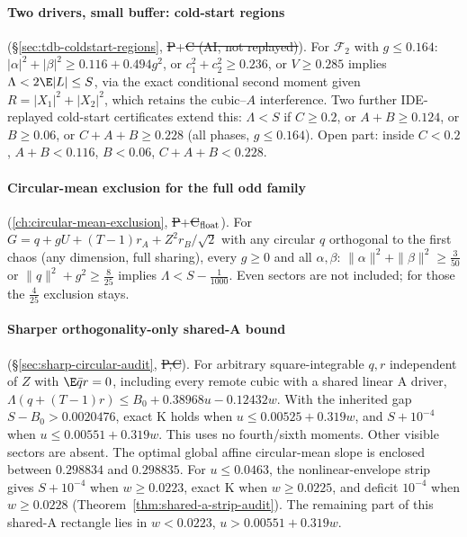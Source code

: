 \paragraph{Two drivers, small buffer: cold-start regions} (\S\ref{sec:tdb-coldstart-regions}, \st{P}+\st{C (AI, not replayed)}). For $\mathcal F_2$ with $g\le0.164$:
$|\alpha|^2+|\beta|^2\ge0.116+0.494g^2$, or $c_1^2+c_2^2\ge0.236$, or $V\ge0.285$ implies $\Lambda<2\E|L|\le S$, via the exact conditional second moment given $R=|X_1|^2+|X_2|^2$,
which retains the cubic--$A$ interference. Two further IDE-replayed cold-start certificates extend this: $\Lambda<S$ if $C\ge0.2$, or $A+B\ge0.124$, or $B\ge0.06$,
or $C+A+B\ge0.228$ (all phases, $g\le0.164$). Open part: inside $C<0.2$, $A+B<0.116$, $B<0.06$, $C+A+B<0.228$.

\paragraph{Circular-mean exclusion for the full odd family} (\autoref{ch:circular-mean-exclusion}, \st{P}+\st{C$_{\rm float}$}). For
$G=q+gU+(T-1)r_A+Z^2r_B/\sqrt2$ with any circular $q$ orthogonal to the first chaos (any dimension, full sharing), every $g\ge0$ and all $\alpha,\beta$:
$\|\alpha\|^2+\|\beta\|^2\ge\frac3{50}$ or $\|q\|^2+g^2\ge\frac8{25}$ implies $\Lambda<S-\frac1{1000}$. Even sectors are not included; for those the $\frac4{25}$ exclusion stays.

\paragraph{Sharper orthogonality-only shared-A bound}
(\S\ref{sec:sharp-circular-audit}, \st{P,C}). For arbitrary square-integrable
$q,r$ independent of $Z$ with $\E\bar q r=0$, including every remote
cubic with a shared linear A driver,
$\Lambda(q+(T-1)r)\le B_0+0.38968u-0.12432w$.
With the inherited gap $S-B_0>0.0020476$, exact K holds when
$u\le0.00525+0.319w$, and $S+10^{-4}$ when
$u\le0.00551+0.319w$. This uses no fourth/sixth moments. Other visible
sectors are absent. The optimal global affine circular-mean slope is
enclosed between $0.298834$ and $0.298835$. For $u\le0.0463$, the nonlinear-envelope strip gives
$S+10^{-4}$ when $w\ge0.0223$, exact K when $w\ge0.0225$, and deficit
$10^{-4}$ when $w\ge0.0228$ (Theorem~\ref{thm:shared-a-strip-audit}).
The remaining part of this shared-A rectangle lies in
$w<0.0223$, $u>0.00551+0.319w$.

